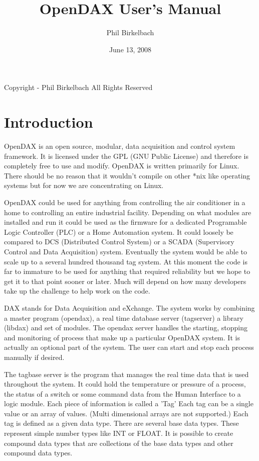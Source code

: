

\title{OpenDAX User's Manual}
\date{June 13, 2008}
\author{Phil Birkelbach}



\maketitle

\begin{flushleft}
Copyright  - Phil Birkelbach\linebreak
All Rights Reserved
\end{flushleft}

\tableofcontents
\newpage
{}
\chapter{Introduction}
OpenDAX is an open source, modular, data acquisition and control system framework. It is licensed under the GPL (GNU Public License) and therefore is completely free to use and modify. OpenDAX is written primarily for Linux.  There should be no reason that it wouldn't compile on other *nix like operating systems but for now we are concentrating on Linux.

OpenDAX could be used for anything from controlling the air conditioner in a home to controlling an entire industrial facility. Depending on what modules are installed and run it could be used as the firmware for a dedicated Programable Logic Controller (PLC) or a Home Automation system. It could loosely be compared to DCS (Distributed Control System) or a SCADA (Supervisory Control and Data Acquisition) system. Eventually the system would be able to scale up to a several hundred thousand tag system. At this moment the code is far to immature to be used for anything that required reliability but we hope to get it to that point sooner or later. Much will depend on how many developers take up the challenge to help work on the code.

DAX stands for Data Acquisition and eXchange. The system works by combining a master program (opendax), a real time database server (tagserver) a library (libdax) and set of modules. The opendax server handles the starting, stopping and monitoring of process that make up a particular OpenDAX system.  It is actually an optional part of the system.  The user can start and stop each process manually if desired.

The tagbase server is the program that manages the real time data that is used throughout the system.  It could hold the temperature or pressure of a process, the status of a switch or some command data from the Human Interface to a logic module.  Each piece of information is called a 'Tag'  Each tag can be a single value or an array of values.  (Multi dimensional arrays are not supported.)  Each tag is defined as a given data type.  There are several base data types. These represent simple number types like INT or FLOAT.  It is possible to create compound
data types that are collections of the base data types and other compound data types.

